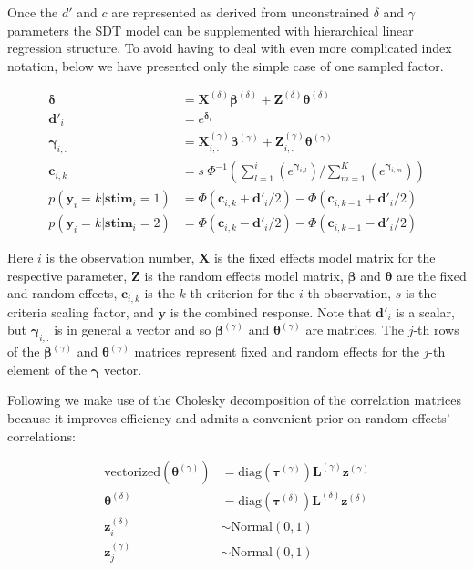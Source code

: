 \documentclass[oneside,a4paper]{article}
\begin{document}
Once the $d'$ and $c$ are represented as derived from unconstrained
$\delta$ and $\gamma$ parameters the SDT model can be supplemented
with hierarchical linear regression structure. To avoid having to deal
with even more complicated index notation, below we have presented
only the simple case of one sampled factor.

\begin{align*}
  \bm{\delta} &= \bm{X}^{(\delta)} \bm{\beta}^{(\delta)} + \bm{Z}^{(\delta)} \bm{\theta}^{(\delta)} \\
  \bm{d'}_i &= e^{\bm{\delta}_i} \\
  \bm{\gamma}_{i,.} &= \bm{X}^{(\gamma)}_{i,.} \bm{\beta}^{(\gamma)} + \bm{Z}^{(\gamma)}_{i,.}
                      \bm{\theta}^{(\gamma)} \\
  \bm{c}_{i,k} &= s \ \Phi^{-1}(\sum_{l = 1}^i(e^{\bm{\gamma}_{i,l}}) /
                 \sum_{m=1}^K(e^{\bm{\gamma}_{i,m}})) \\
  p(\bm{y}_i = k|\bm{stim}_i = 1) &= \Phi(\bm{c}_{i,k} + \bm{d'}_i / 2) - \Phi(\bm{c}_{i,k-1} + \bm{d'}_i / 2) \\
  p(\bm{y}_i = k|\bm{stim}_i = 2) &= \Phi(\bm{c}_{i,k} - \bm{d'}_i / 2) - \Phi(\bm{c}_{i,k-1} - \bm{d'}_i / 2)
\end{align*}

\noindent Here $i$ is the observation number, $\bm{X}$ is the fixed
effects model matrix for the respective parameter, $\bm{Z}$ is the
random effects model matrix, $\bm{\beta}$ and $\bm{\theta}$ are the
fixed and random effects, $\bm{c}_{i,k}$ is the $k$-th criterion for
the $i$-th observation, $s$ is the criteria scaling factor, and
$\bm{y}$ is the combined response. Note that $\bm{d'}_i$ is a scalar,
but $\bm{\gamma}_{i,.}$ is in general a vector and so
$\bm{\beta}^{(\gamma)}$ and $\bm{\theta}^{(\gamma)}$ are matrices. The
$j$-th rows of the $\bm{\beta}^{(\gamma)}$ and
$\bm{\theta}^{(\gamma)}$ matrices represent fixed and random effects
for the $j$-th element of the $\bm{\gamma}$ vector.

Following  we make use of the Cholesky
decomposition of the correlation matrices because it improves
efficiency and admits a convenient prior on random effects'
correlations:

\begin{align*}
  \text{vectorized}(\bm{\theta}^{(\gamma)}) &= \text{diag}(\bm{\tau}^{(\gamma)}) \bm{L}^{(\gamma)} \bm{z}^{(\gamma)} \\
  \bm{\theta}^{(\delta)} &= \text{diag}(\bm{\tau}^{(\delta)}) \bm{L}^{(\delta)} \bm{z}^{(\delta)} \\
  \bm{z}^{(\delta)}_i &\sim \text{Normal}(0, 1) \\
  \bm{z}^{(\gamma)}_j &\sim \text{Normal}(0, 1)
\end{align*}
\end{document}
